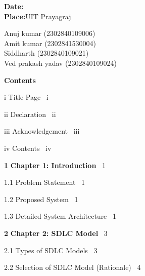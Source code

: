 \documentclass[12pt,a4paper]{report}
\begin{document}
\vspace{1.0cm}

\noindent\textbf{Date:}\\
\noindent\textbf{Place:}\hspace{1cm}UIT Prayagraj

\vspace{1.0cm}
\begin{flushright}
Anuj kumar (2302840109006)\\
Amit kumar (2302841530004)\\
Siddharth (2302840109021)\\
Ved prakash yadav (2302840109024)
\end{flushright}

\clearpage

\clearpage
\thispagestyle{plain}

\begin{center}
{\LARGE\bfseries Contents}\\[-0.1cm]
\end{center}

\vspace{0.2cm}
\setlength{\parindent}{0pt}
\setlength{\parskip}{0.25em}

\noindent i \quad Title Page \dotfill\ i

\noindent ii \quad Declaration \dotfill\ ii

\noindent iii \quad Acknowledgement \dotfill\ iii

\noindent iv \quad Contents \dotfill\ iv

\bigskip

\noindent \textbf{1} \quad \textbf{Chapter 1: Introduction} \dotfill\ 1

\hspace{1.2cm}1.1 \quad Problem Statement \dotfill\ 1

\hspace{1.2cm}1.2 \quad Proposed System \dotfill\ 1

\hspace{1.2cm}1.3 \quad Detailed System Architecture \dotfill\ 1

\bigskip

\noindent \textbf{2} \quad \textbf{Chapter 2: SDLC Model} \dotfill\ 3

\hspace{1.2cm}2.1 \quad Types of SDLC Models \dotfill\ 3

\hspace{1.2cm}2.2 \quad Selection of SDLC Model (Rationale) \dotfill\ 4
\end{document}
